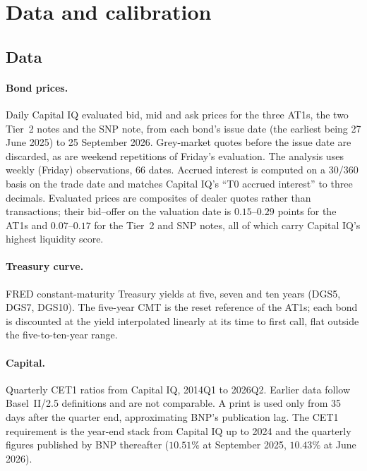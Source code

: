 \section{Data and calibration}\label{sec:calibration}

\subsection{Data}

\paragraph{Bond prices.} Daily Capital IQ evaluated bid, mid and ask prices for the three
AT1s, the two Tier~2 notes and the SNP note, from each bond's issue date (the earliest
being 27 June 2025) to 25 September 2026. Grey-market quotes before the issue date are
discarded, as are weekend repetitions of Friday's evaluation. The analysis uses weekly
(Friday) observations, 66 dates. Accrued interest is computed on a 30/360 basis on the
trade date and matches Capital IQ's ``T0 accrued interest'' to three decimals. Evaluated
prices are composites of dealer quotes rather than transactions; their bid--offer on the
valuation date is $0.15$--$0.29$ points for the AT1s and $0.07$--$0.17$ for the Tier~2 and
SNP notes, all of which carry Capital IQ's highest liquidity score.

\paragraph{Treasury curve.} FRED constant-maturity Treasury yields at five, seven and ten
years (DGS5, DGS7, DGS10). The five-year CMT is the reset reference of the AT1s; each bond is
discounted at the yield interpolated linearly at its time to first call, flat outside the
five-to-ten-year range.

\paragraph{Capital.} Quarterly CET1 ratios from Capital IQ, 2014Q1 to 2026Q2. Earlier data
follow Basel~II/2.5 definitions and are not comparable. A print is used only from 35 days
after the quarter end, approximating BNP's publication lag. The CET1 requirement is the
year-end stack from Capital IQ up to 2024 and the quarterly figures published by BNP
thereafter ($10.51\%$ at September 2025, $10.43\%$ at June 2026).

